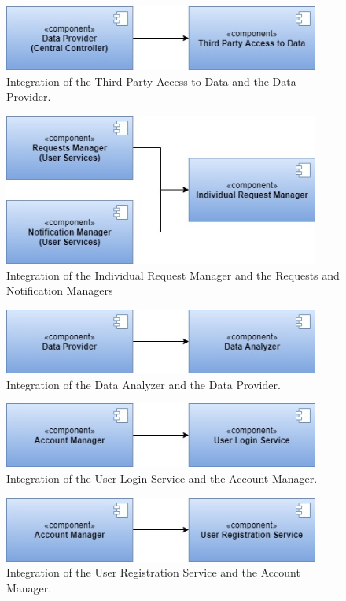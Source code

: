\begin{figure}[H]
    \centering
    \includegraphics[width=295pt]{images/IntegrationSequence/TrackMe-Integration_sequence15.jpg}
    \caption{Integration of the Third Party Access to Data and the Data Provider.}
\end{figure}
\begin{figure}[H]
    \centering
    \includegraphics[width=295pt]{images/IntegrationSequence/TrackMe-Integration_sequence9.jpg}
    \caption{Integration of the Individual Request Manager and the Requests and Notification Managers}
\end{figure}
\begin{figure}[H]
    \centering
    \includegraphics[width=295pt]{images/IntegrationSequence/TrackMe-Integration_sequence18.jpg}
    \caption{Integration of the Data Analyzer and the Data Provider.}
\end{figure}
\begin{figure}[H]
    \centering
    \includegraphics[width=295pt]{images/IntegrationSequence/TrackMe-Integration_sequence11.jpg}
    \caption{Integration of the User Login Service and the Account Manager.}
\end{figure}
\begin{figure}[H]
    \centering
    \includegraphics[width=295pt]{images/IntegrationSequence/TrackMe-Integration_sequence12.jpg}
    \caption{Integration of the User Registration Service and the Account Manager.}
\end{figure}
